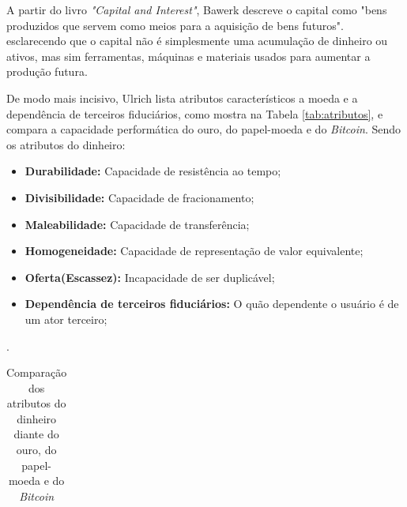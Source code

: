 \documentclass[article,12pt,oneside,a4paper,english,brazil]{unifil}
\begin{document}
\begin{Spacing}{1.5}
A partir do livro \textit{"Capital and Interest"}\cite{bohm1884capital}, Bawerk descreve o capital como "bens produzidos que servem como meios para a aquisição de bens futuros". esclarecendo que o capital não é simplesmente uma acumulação de dinheiro ou ativos, mas sim ferramentas, máquinas e materiais usados para aumentar a produção futura.

De modo mais incisivo, Ulrich lista atributos característicos a moeda e a dependência de terceiros fiduciários, como mostra na Tabela \ref*{tab:atributos}, e compara a capacidade performática do ouro, do papel-moeda e do \textit{Bitcoin}.
Sendo os atributos do dinheiro:
\begin{itemize}
    \item \textbf{Durabilidade:} Capacidade de resistência ao tempo;
    \item \textbf{Divisibilidade:} Capacidade de fracionamento;
    \item \textbf{Maleabilidade:} Capacidade de transferência;
    \item \textbf{Homogeneidade:} Capacidade de representação de valor equivalente;
    \item \textbf{Oferta(Escassez):} Incapacidade de ser duplicável;
    \item \textbf{Dependência de terceiros fiduciários:} O quão dependente o usuário é de um ator terceiro;

\end{itemize}

\FloatBarrier
\begin{table}[h]
    \centering
	\captionsetup{justification=centering}
	\caption{Comparação dos atributos do dinheiro diante do ouro, do papel-moeda e do \textit{Bitcoin}}.
	\begin{tabular}{|c|c|c|c|}


\end{tabular}
\end{table}
\end{Spacing}
\end{document}
